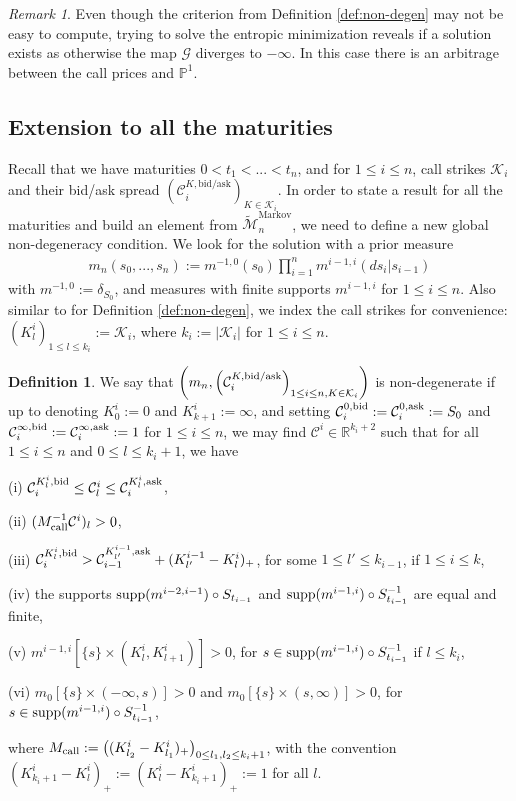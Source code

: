 \documentclass{amsart}%
\def \P{{\mathbb P}}
\def \R{\mathbb{R}}
\def\Cc{{\cal C}}
\def\Gc{{\cal G}}
\def\Kc{{\cal K}}
\def \Prod{\displaystyle\prod}
\def\no{\noindent}
\def\x{\times}
\theoremstyle{definition}
\newtheorem{defn}[thm]{Definition}
\theoremstyle{remark}
\newtheorem{rem}[thm]{Remark}
\newcommand{\beaa}{\begin{eqnarray*}}
\newcommand{\eeaa}{\end{eqnarray*}}
\newcommand{\cal}{\mathcal}
\begin{document}
\begin{rem}
Even though the criterion from Definition \ref{def:non-degen} may not be easy to compute, trying to solve the entropic minimization reveals if a solution exists as otherwise the map $\Gc$ diverges to $-\infty$. In this case there is an arbitrage between the call prices and $\P^1$.
\end{rem}


\subsection{Extension to all the maturities}\label{subsect:all_maturities}

Recall that we have maturities $0<t_1<...<t_n$, and for $1\le i\le n$, call strikes $\Kc_i$ and their bid/ask spread $(\Cc^{K,\mathrm{bid/ask}}_i)_{K\in\Kc_i}$. In order to state a result for all the maturities and build an element from $\widetilde{\cal M}^\mathrm{Markov}_n$, we need to define a new global non-degeneracy condition. We look for the solution with a prior measure
\beaa 
m_n(s_0,...,s_n):=m^{-1,0}(s_0)\Prod_{i=1}^n m^{i-1,i}(ds_i|s_{i-1})
\eeaa 
with $m^{-1,0}:= \delta_{S_0}$, and measures with finite supports $m^{i-1,i}$ for $1\le i\le n$. Also similar to for Definition \ref{def:non-degen}, we index the call strikes for convenience: $(K^i_l)_{1\le l\le k_i}:=\Kc_i$, where $k_i:=|\Kc_i|$ for $1\le i \le n$.


\begin{defn}\label{def:non-degen-all}
We say that $\left(m_n, \left(\Cc^{K,{\rm bid/ask}}_i\right)_{1\le i\le n,K\in\Kc_i}\right)$ is non-degenerate if up to denoting $K^i_0:=0$ and $K^i_{k+1}:=\infty$, and setting $\Cc^{0,{\rm bid}}_i := \Cc^{0,{\rm ask}}_i := S_0$ and $\Cc^{\infty,{\rm bid}}_i := \Cc^{\infty,{\rm ask}}_i := 1$ for $1\le i\le n$, we may find $\Cc^i\in \R^{k_i+2}$ such that for all $1\le i\le n$ and $0\le l \le k_i+1$, we have

\no\rm{(i)} $\Cc^{K^i_l,{\rm bid}}_i\le \Cc^i_l\le \Cc^{K^i_l,{\rm ask}}_i$,

\no\rm{(ii)} $( M_{\rm call}^{-1}\Cc^i)_l>0$,

\no\rm{(iii)} $\Cc^{K^i_l,\rm bid}_i>\Cc^{K^{i-1}_{l'},\rm ask}_{i-1}+(K^{i-1}_{l'}-K^i_l)_+$, for some $1\le l'\le k_{i-1}$, if $1\le i\le k$,

\no\rm{(iv)} the supports ${\rm supp}(m^{i-2, i-1})\circ S_{t_{i-1}}$ and ${\rm supp}(m^{i-1, i})\circ S_{t_{i-1}}^{-1}$ are equal and finite,

\no\rm{(v)} $m^{i-1, i}[\{s\}\x (K^i_l, K^i_{l+1})]>0$, for $s\in{\rm supp}(m^{i-1, i})\circ S_{t_{i-1}}^{-1}$ if $l\le k_i$,

\no\rm{(vi)} $m_0[\{s\}\x (-\infty, s)]>0$ and $m_0[\{s\}\x (s, \infty)]>0$, for $s\in{\rm supp}(m^{i-1, i})\circ S_{t_{i-1}}^{-1}$,

\no where $ M_{\rm call}:=\big((K^i_{l_2}-K^i_{l_1})_+\big)_{0\le l_1,l_2\le k_i+1}$, with the convention $(K^i_{k_i+1}-K^i_l)_+ := (K^i_l-K^i_{k_i+1})_+ := 1$ for all $l$.
\end{defn}
\end{document}
